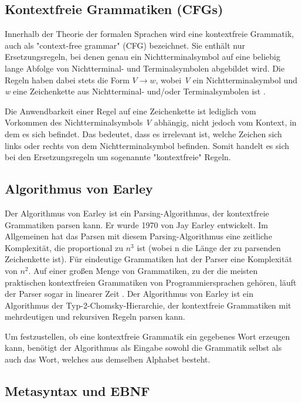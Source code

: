 \subsection*{Kontextfreie Grammatiken (CFGs)}
Innerhalb der Theorie der formalen Sprachen wird eine kontextfreie Grammatik, auch als "context-free grammar" (CFG) bezeichnet. 
Sie enthält nur Ersetzungsregeln, bei denen genau ein Nichtterminalsymbol auf eine beliebig lange Abfolge von Nichtterminal- und Terminalsymbolen abgebildet wird.
Die Regeln haben dabei stets die Form $V \rightarrow w$, wobei \textit{V} ein Nichtterminalsymbol und \textit{w} eine Zeichenkette aus Nichtterminal- 
und/oder Terminalsymbolen ist \cite{NearleyGlossary}.

Die Anwendbarkeit einer Regel auf eine Zeichenkette ist lediglich vom Vorkommen des Nichtterminalsymbols \textit{V} abhängig, nicht jedoch vom Kontext, in dem es 
sich befindet. Das bedeutet, dass es irrelevant ist, welche Zeichen sich links oder rechts von dem Nichtterminalsymbol befinden. Somit handelt es sich bei 
den Ersetzungsregeln um sogenannte "kontextfreie" Regeln.

\subsection*{Algorithmus von Earley}
Der Algorithmus von Earley ist ein Parsing-Algorithmus, der kontextfreie Grammatiken parsen kann. Er wurde 1970 von Jay Earley entwickelt.
Im Allgemeinen hat das Parsen mit diesem Parsing-Algorithmus eine zeitliche Komplexität, die proportional zu $n^3$ ist (wobei n die Länge der zu parsenden 
Zeichenkette ist). Für eindeutige Grammatiken hat der Parser eine Komplexität von $n^2$. Auf einer großen Menge von Grammatiken, zu der die 
meisten praktischen kontextfreien Grammatiken von Programmiersprachen gehören, läuft der Parser sogar in linearer Zeit \cite{Earley1970}. 
Der Algorithmus von Earley ist ein Algorithmus der Typ-2-Chomsky-Hierarchie, der kontextfreie Grammatiken mit mehrdeutigen und rekursiven Regeln parsen kann. 

Um festzustellen, ob eine kontextfreie Grammatik ein gegebenes Wort erzeugen kann, benötigt der Algorithmus als Eingabe sowohl die Grammatik selbst 
als auch das Wort, welches aus demselben Alphabet besteht.

\subsection*{Metasyntax und EBNF}

